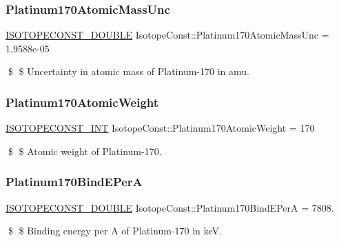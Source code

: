\subsubsection{\texorpdfstring{Platinum170\+Atomic\+Mass\+Unc}{Platinum170AtomicMassUnc}}
{\footnotesize\ttfamily \mbox{\hyperlink{group___isotope_const-_macros_ga8f45a7272ce02c0b4c65c44636ed719a}{I\+S\+O\+T\+O\+P\+E\+C\+O\+N\+S\+T\+\_\+\+D\+O\+U\+B\+LE}} Isotope\+Const\+::\+Platinum170\+Atomic\+Mass\+Unc = 1.\+9588e-\/05}

\$ \$ Uncertainty in atomic mass of Platinum-\/170 in amu. \mbox{\label{group___isotope_const-_platinum-_pt170_gaa795946cca84a0d52cf228afeca96acc}} 
\subsubsection{\texorpdfstring{Platinum170\+Atomic\+Weight}{Platinum170AtomicWeight}}
{\footnotesize\ttfamily \mbox{\hyperlink{group___isotope_const-_macros_ga5f18360b3e99483a35c32d789e62621c}{I\+S\+O\+T\+O\+P\+E\+C\+O\+N\+S\+T\+\_\+\+I\+NT}} Isotope\+Const\+::\+Platinum170\+Atomic\+Weight = 170}

\$ \$ Atomic weight of Platinum-\/170. \mbox{\label{group___isotope_const-_platinum-_pt170_ga1f2c051da3d667b7e511c862a6407816}} 
\subsubsection{\texorpdfstring{Platinum170\+Bind\+E\+PerA}{Platinum170BindEPerA}}
{\footnotesize\ttfamily \mbox{\hyperlink{group___isotope_const-_macros_ga8f45a7272ce02c0b4c65c44636ed719a}{I\+S\+O\+T\+O\+P\+E\+C\+O\+N\+S\+T\+\_\+\+D\+O\+U\+B\+LE}} Isotope\+Const\+::\+Platinum170\+Bind\+E\+PerA = 7808.}

\$ \$ Binding energy per A of Platinum-\/170 in keV. \mbox{\label{group___isotope_const-_platinum-_pt170_gacae5360556b108eb874c0745ab9c8e15}} 
